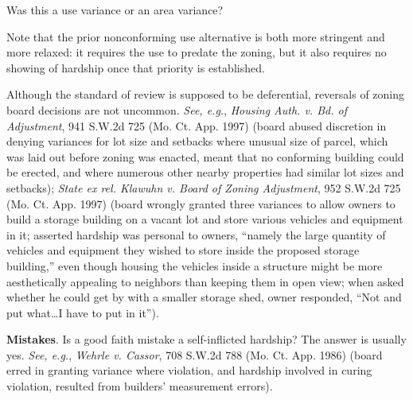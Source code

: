 
\item Was this a use variance or an area variance? 

\item
Note that the prior nonconforming use alternative is both more stringent and
more relaxed: it requires the use to predate the zoning, but it also requires no
showing of hardship once that priority is established.

\item
Although the standard of review is supposed to be deferential, reversals of
zoning board decisions are not uncommon. \textit{See, e.g.}, \emph{Housing
Auth. v. Bd. of Adjustment},
941 S.W.2d 725 (Mo. Ct. App. 1997) (board abused discretion in denying
variances for lot size and setbacks where unusual size of parcel, which was laid
out before zoning was enacted, meant that no conforming building could be
erected, and where numerous other nearby properties had similar lot sizes and
setbacks); \emph{State ex rel. Klawuhn v. Board of Zoning Adjustment},
952 S.W.2d 725 (Mo. Ct. App. 1997) (board wrongly granted three
variances to allow owners to build a storage building on a vacant lot and store
various vehicles and equipment in it; asserted hardship was personal to owners,
``namely the large quantity of vehicles and equipment they wished to store
inside the proposed storage building,'' even though housing the vehicles inside
a structure might be more aesthetically appealing to neighbors than keeping them
in open view; when asked whether he could get by with a smaller storage shed,
owner responded, ``Not and put what\ldots I have to put in it''). 

\item
\textbf{Mistakes}. Is a good faith mistake a self-inflicted hardship? The answer
is usually yes. \textit{See, e.g.}, \emph{Wehrle v. Cassor}, 708 S.W.2d 788 (Mo.
Ct. App. 1986) (board erred in granting variance where violation, and hardship
involved in curing violation, resulted from builders' measurement errors).

